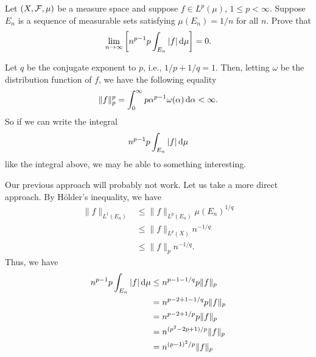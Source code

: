 \begin{problem}
  Let $(X,\mathcal{F},\mu)$ be a measure space and suppose $f\in L^p(\mu)$,
  $1\leq p<\infty$. Suppose $E_n$ is a sequence of measurable sets
  satisfying $\mu(E_n)=1/n$ for all $n$. Prove that
  \[
    \lim_{n\to\infty}\left[n^{p-1}{p}\int_{E_n}|f|\mathop{}\!\mathrm{d}\mu\right]=0.
  \]
\end{problem}
\begin{solution}
  Let $q$ be the conjugate exponent to $p$, i.e., $1/p+1/q=1$. Then,
  letting $\omega$ be the distribution function of $f$, we have the
  following equality
  \[
    \|f\|_p^p=%
    \int_{0}^\infty p\alpha^{p-1}\omega(\alpha)\diff\alpha%
    <%
    \infty.
  \]
  So if we can write the integral
  \[
    n^{p-1}p\int_{E_n} |f|\mathop{}\!\mathrm{d}\mu
  \]
  like the integral above, we may be able to something interesting.

  Our previous approach will probably not work. Let us take a more direct
  approach. By Hölder's inequality, we have
  \begin{align*}
    \|f\|_{L^1(E_n)}
    &\leq \|f\|_{L^p(E_n)}\mu(E_n)^{1/q}\\%
    &\leq \|f\|_{L^p(X)}n^{-1/q}\\
    &\leq \|f\|_pn^{-1/q}.
  \end{align*}
  Thus, we have
  \begin{align*}
    n^{p-1}p\int_{E_n}|f|\mathop{}\!\mathrm{d}\mu
    &\leq n^{p-1-1/q}p\|f\|_p\\
    &=n^{p-2+1-1/q}p\|f\|_p\\
    &=n^{p-2+1/p}p\|f\|_p\\
    &=n^{(p^2-2p+1)/p}\|f\|_p\\
    &=n^{(p-1)^2/p}\|f\|_p
  \end{align*}
\end{solution}


